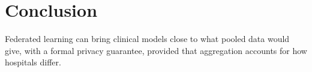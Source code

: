 \chapter{Conclusion}
\label{ch:conclusion}

Federated learning can bring clinical models close to what pooled data would give, with a formal
privacy guarantee, provided that aggregation accounts for how hospitals differ.
